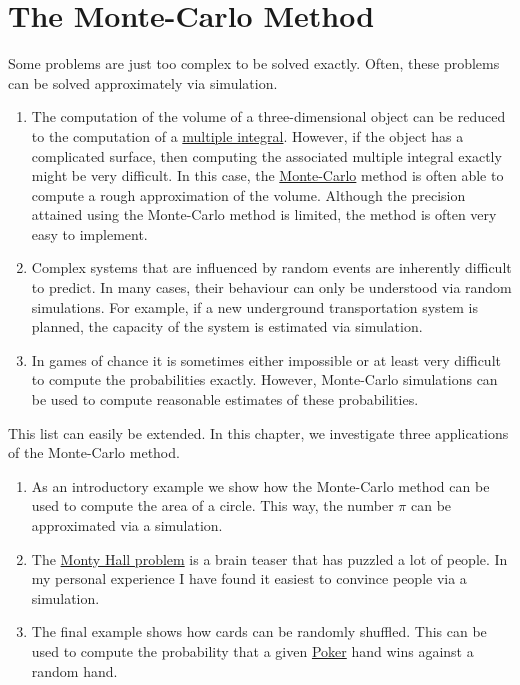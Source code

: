 \chapter{The Monte-Carlo Method}
Some problems are just too complex to be solved exactly.  Often, these problems can be solved approximately via simulation.
\begin{enumerate}
\item The computation of the volume of a three-dimensional object can be reduced to the computation of a
      \href{https://en.wikipedia.org/wiki/Multiple_integral}{multiple integral}.
      However, if the object has a complicated surface, then computing the associated multiple integral exactly
      might be very difficult.
      In this case, the \href{https://en.wikipedia.org/wiki/Monte_Carlo_integration}{Monte-Carlo} method is
      often able to compute a rough approximation of the volume.  Although the precision attained using the Monte-Carlo
      method is limited, the method is often very easy to implement.
\item Complex systems that are influenced by random events are inherently difficult to predict.  In many cases,
      their behaviour can only be understood via random simulations.  For example, if a new underground transportation system
      is planned, the capacity of the system is estimated via simulation.
\item In games of chance it is sometimes either impossible or at least very difficult to compute the
      probabilities exactly.  However, Monte-Carlo simulations can be used to compute reasonable estimates of these probabilities.
\end{enumerate}
This list can easily be extended.  In this chapter, we investigate three applications of the Monte-Carlo method.
\begin{enumerate}
\item As an introductory example we show how the Monte-Carlo method can be used to compute the area of a
      circle.  This way, the number \href{https://en.wikipedia.org/wiki/Pi}{$\pi$} can be approximated via a simulation.
\item The \href{https://en.wikipedia.org/wiki/Monty_Hall_problem}{Monty Hall problem} is a brain teaser that
      has puzzled a lot of people.  In my personal experience I have found it easiest to convince people via
      a simulation.
\item The final example shows how cards can be randomly shuffled.  This can be used to compute the probability
      that a given \href{https://en.wikipedia.org/wiki/Poker}{Poker} hand wins against a random hand.
\end{enumerate}

